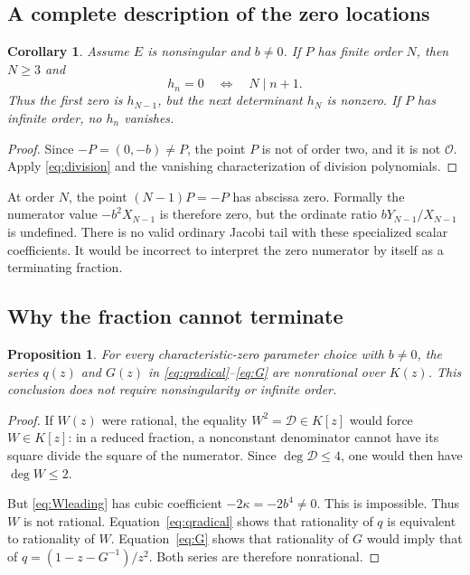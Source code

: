 \documentclass[11pt,letterpaper]{article}
\numberwithin{equation}{section}
\newtheorem{proposition}[theorem]{Proposition}
\newtheorem{corollary}[theorem]{Corollary}
\theoremstyle{definition}
\theoremstyle{remark}
\newcommand{\K}{K}
\newcommand{\OO}{\mathcal{O}}
\newcommand{\D}{\mathcal{D}}
\begin{document}
\subsection{A complete description of the zero locations}
\begin{corollary}\label{cor:torsion}
Assume $E$ is nonsingular and $b\ne0$. If $P$ has finite order $N$, then
$N\ge3$ and
\begin{equation}\label{eq:zeros}
 h_n=0\quad\Longleftrightarrow\quad N\mid n+1.
\end{equation}
Thus the first zero is $h_{N-1}$, but the next determinant $h_N$ is nonzero.
If $P$ has infinite order, no $h_n$ vanishes.
\end{corollary}
\begin{proof}
Since $-P=(0,-b)\ne P$, the point $P$ is not of order two, and it is
not $\OO$. Apply \eqref{eq:division} and the vanishing characterization
of division polynomials.
\end{proof}

At order $N$, the point $(N-1)P=-P$ has abscissa zero. Formally the
numerator value $-b^2X_{N-1}$ is therefore zero, but the ordinate ratio
$bY_{N-1}/X_{N-1}$ is undefined. There is no valid ordinary Jacobi tail
with these specialized scalar coefficients. It would be incorrect to
interpret the zero numerator by itself as a terminating fraction.

\subsection{Why the fraction cannot terminate}\label{subsec:nonrational}
\begin{proposition}\label{prop:nonrational}
For every characteristic-zero parameter choice with $b\ne0$, the series
$q(z)$ and $G(z)$ in \eqref{eq:qradical}--\eqref{eq:G} are nonrational
over $\K(z)$. This conclusion does not require nonsingularity or
infinite order.
\end{proposition}
\begin{proof}
If $W(z)$ were rational, the equality $W^2=\D\in\K[z]$ would force
$W\in\K[z]$: in a reduced fraction, a nonconstant denominator cannot
have its square divide the square of the numerator. Since $\deg\D\le4$,
one would then have $\deg W\le2$.

But \eqref{eq:Wleading} has cubic coefficient $-2\kappa=-2b^4\ne0$.
This is impossible. Thus $W$ is not rational. Equation~\eqref{eq:qradical}
shows that rationality of $q$ is equivalent to rationality of $W$.
Equation~\eqref{eq:G} shows that rationality of $G$ would imply that of
$q=(1-z-G^{-1})/z^2$. Both series are therefore nonrational.
\end{proof}
\end{document}
